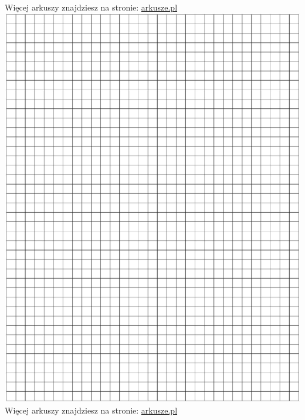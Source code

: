 \documentclass[10pt]{article}
\begin{document}
Więcej arkuszy znajdziesz na stronie: \href{http://arkusze.pl}{arkusze.pl}\\
\includegraphics[max width=\textwidth, center]{2024_11_21_a7a52c0c0974ad42b88bg-16}\\
Więcej arkuszy znajdziesz na stronie: \href{http://arkusze.pl}{arkusze.pl}\\
\end{document}
